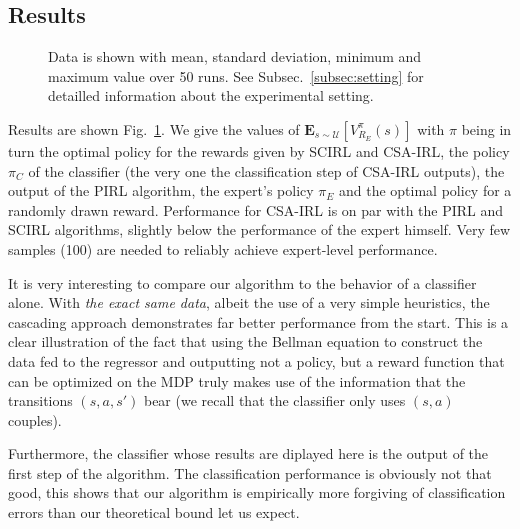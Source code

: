 \documentclass[smallextended]{svjour3}
\begin{document}
\subsection{Results}
\label{subsec:results}
\begin{figure}

  \caption{Data is shown with mean, standard deviation, minimum and maximum value over 50 runs. See Subsec.~\ref{subsec:setting} for detailled information about the experimental setting.}
  \label{fig:Highway}
\end{figure}

Results are shown Fig.~\ref{fig:Highway}. We give the values of $\mathbf{E}_{s\sim\mathcal{U}}[V^{\pi}_{R_E}(s)]$ with $\pi$ being in turn the optimal policy for the rewards given by SCIRL and CSA-IRL, the policy $\pi_C$ of the classifier (the very one the classification step of CSA-IRL outputs), the output of the PIRL algorithm, the expert's policy $\pi_E$ and the optimal policy for a randomly drawn reward. Performance for CSA-IRL is on par with the PIRL and SCIRL algorithms, slightly below the performance of the expert himself. Very few samples (100) are needed to reliably achieve expert-level performance.

It is very interesting to compare our algorithm to the behavior of a classifier alone. With \emph{the exact same data}, albeit the use of a very simple heuristics, the cascading approach demonstrates far better performance from the start. This is a clear illustration of the fact that using the Bellman equation to construct the data fed to the regressor and outputting not a policy, but a reward function that can be optimized on the MDP truly makes use of the information that the transitions $(s,a,s')$ bear (we recall that the classifier only uses $(s,a)$ couples).

Furthermore, the classifier whose results are diplayed here is the output of the first step of the algorithm. The classification performance is obviously not that good, this shows that our algorithm is empirically more forgiving of classification errors than our theoretical bound let us expect.
\end{document}
